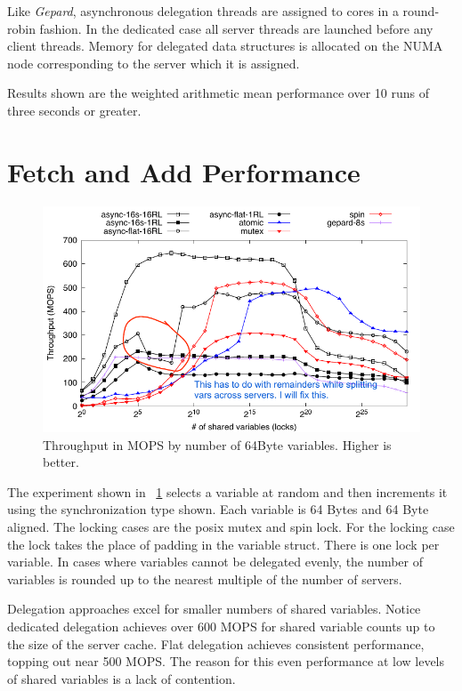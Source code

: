 \documentclass{uicthesi}
\begin{document}
Like \textit{Gepard}, asynchronous delegation threads are assigned to cores in a round-robin fashion. In the dedicated case all server threads are launched before any client threads. Memory for delegated data structures is allocated on the NUMA node corresponding to the server which it is assigned. 

Results shown are the weighted arithmetic mean performance over 10 runs of three seconds or greater. 

\section{Fetch and Add Performance}
\begin{figure}[ht!]
\centering
\includegraphics[width=0.9\columnwidth]{FIG/fetch_and_add_thput.pdf}
\caption{Throughput in MOPS by number of 64Byte variables. Higher is better. }
\label{fig:fetch_and_add_thput}
\end{figure}

The experiment shown in ~\ref{fig:fetch_and_add_thput} selects a variable at random and then increments it using the synchronization type shown. Each variable is 64 Bytes and 64 Byte aligned. The locking cases are the posix mutex and spin lock. For the locking case the lock takes the place of padding in the variable struct. There is one lock per variable. In cases where variables cannot be delegated evenly, the number of variables is rounded up to the nearest multiple of the number of servers. 

Delegation approaches excel for smaller numbers of shared variables. Notice dedicated delegation achieves over 600 MOPS for shared variable counts up to the size of the server cache. Flat delegation achieves consistent performance, topping out near 500 MOPS. The reason for this even performance at low levels of shared variables is a lack of contention.
\end{document}
